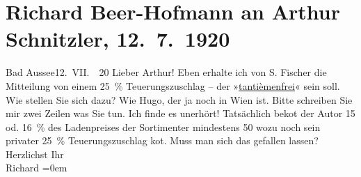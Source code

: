 

         
         \renewcommand{\erwaehntePersonen}{Personen: Samuel Fischer, Hugo von Hofmannsthal}
         \renewcommand{\erwaehnteOrte}{Orte: Bad Aussee, Wien}
         \renewcommand{\erwaehnteWerke}{}
               \section[Richard Beer-Hofmann an Arthur Schnitzler, 12. 7. 1920]{ Richard Beer-Hofmann an Arthur Schnitzler,
               12. 7. 1920}\nopagebreak{}\rehead{ }\begin{ledgroupsized}[t]{13cm}\normalsize\beginnumbering \toendnotes[C]{\smallbreak\pagebreak[2]} 
\pstart
           {\pb}Bad Aussee12. VII.  20\pend
           \pstart
           Lieber Arthur! Eben erhalte ich von S. Fischer die Mitteilung von einem 25 {\%}
               Teuerungszuschlag – der »\uline{tantièmenfrei}« sein soll.
               Wie stellen Sie sich dazu? Wie Hugo, der ja noch
               in Wien ist. Bitte schreiben Sie mir zwei Zeilen was
               Sie tun. Ich finde es unerhört! Tatsächlich  beko{\geminationm}t der Autor 15
               od. 16 {\%} des Ladenpreises der Sortimenter mindestens 50 wozu
               noch sein privater {\pb}25 {\%} Teuerungszuschlag ko{\geminationm}t. Muss
               man sich das gefallen lassen?\pend
           \pstart
           Herzlichst Ihr{\\[\baselineskip]}\spacefill\mbox{Richard}\pend
           \leftskip=0em{}
         
         \endnumbering{}\end{ledgroupsized}  \newcommand{\dateiname}{L02348}\newcommand{\titel}{Richard Beer-Hofmann an Arthur Schnitzler, 12. 7. 1920}\newcommand{\editorInnen}{Martin Anton Müller und Gerd-Hermann Susen}
      